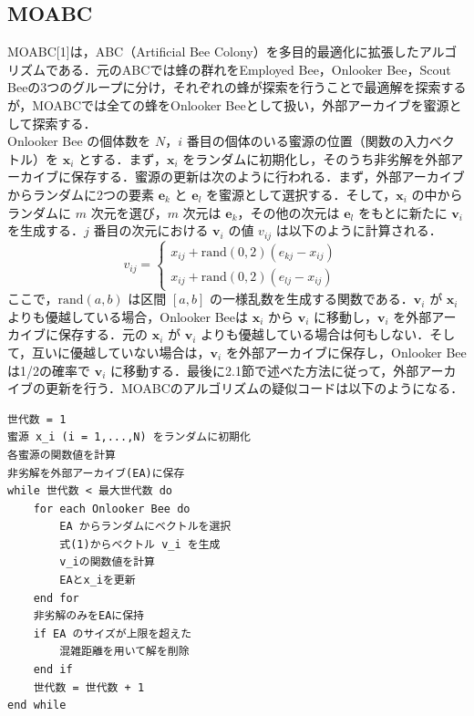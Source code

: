 \documentclass[a4paper, twocolumn]{ltjsarticle}
\begin{document}
\subsection{MOABC}
MOABC[1]は，ABC（Artificial Bee Colony）を多目的最適化に拡張したアルゴリズムである．元のABCでは蜂の群れをEmployed Bee，Onlooker Bee，Scout Beeの3つのグループに分け，それぞれの蜂が探索を行うことで最適解を探索するが，MOABCでは全ての蜂をOnlooker Beeとして扱い，外部アーカイブを蜜源として探索する．\\\quad
Onlooker Bee の個体数を $N$，$i$ 番目の個体のいる蜜源の位置（関数の入力ベクトル）を $\boldsymbol{x}_i$ とする．まず，$\boldsymbol{x}_i$ をランダムに初期化し，そのうち非劣解を外部アーカイブに保存する．蜜源の更新は次のように行われる．まず，外部アーカイブからランダムに2つの要素 $\boldsymbol{e}_k$ と $\boldsymbol{e}_l$ を蜜源として選択する．そして，$\boldsymbol{x}_i$ の中からランダムに $m$ 次元を選び，$m$ 次元は $\boldsymbol{e}_k$，その他の次元は $\boldsymbol{e}_l$ をもとに新たに $\boldsymbol{v}_i$ を生成する．$j$ 番目の次元における $\boldsymbol{v}_i$ の値 $v_{ij}$ は以下のように計算される．
\begin{equation}
    v_{ij} = 
    \begin{cases}
        x_{ij} + \mathrm{rand}(0, 2)(e_{kj} - x_{ij}) &\\
        x_{ij} + \mathrm{rand}(0, 2)(e_{lj} - x_{ij}) &
    \end{cases}
\end{equation}
ここで，$\mathrm{rand}(a, b)$ は区間 $[a, b]$ の一様乱数を生成する関数である．$\boldsymbol{v}_i$ が $\boldsymbol{x}_i$ よりも優越している場合，Onlooker Beeは $\boldsymbol{x}_i$ から $\boldsymbol{v}_i$ に移動し，$\boldsymbol{v}_i$ を外部アーカイブに保存する．元の $\boldsymbol{x}_i$ が $\boldsymbol{v}_i$ よりも優越している場合は何もしない．そして，互いに優越していない場合は，$\boldsymbol{v}_i$ を外部アーカイブに保存し，Onlooker Beeは1/2の確率で $\boldsymbol{v}_i$ に移動する．最後に2.1節で述べた方法に従って，外部アーカイブの更新を行う．MOABCのアルゴリズムの疑似コードは以下のようになる．

\begin{lstlisting}
世代数 = 1
蜜源 x_i (i = 1,...,N) をランダムに初期化
各蜜源の関数値を計算
非劣解を外部アーカイブ(EA)に保存
while 世代数 < 最大世代数 do
    for each Onlooker Bee do
        EA からランダムにベクトルを選択
        式(1)からベクトル v_i を生成
        v_iの関数値を計算
        EAとx_iを更新
    end for
    非劣解のみをEAに保持
    if EA のサイズが上限を超えた
        混雑距離を用いて解を削除
    end if
    世代数 = 世代数 + 1
end while
\end{lstlisting}    
\end{document}
